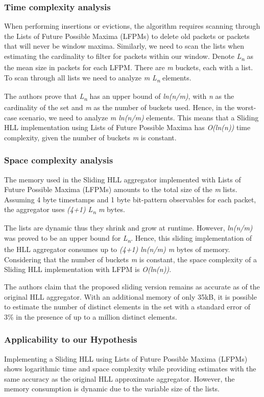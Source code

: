 \subsubsection*{Time complexity analysis}
When performing insertions or evictions, the algorithm requires scanning through the Lists of Future Possible Maxima (LFPMs) to delete old packets or packets that will never be window maxima. Similarly, we need to scan the lists when estimating the cardinality to filter for packets within our window. Denote \textit{L\textsubscript{n}} as the mean size in packets for each LFPM. There are \textit{m} buckets, each with a list. To scan through all lists we need to analyze \textit{m L\textsubscript{n}} elements. 

The authors prove that \textit{L\textsubscript{n}} has an upper bound of \textit{ln(n/m)}, with \textit{n} as the cardinality of the set and \textit{m} as the number of buckets used. Hence, in the worst-case scenario, we need to analyze \textit{m ln(n/m)} elements. This means that a Sliding HLL implementation using Lists of Future Possible Maxima has \textit{O(ln(n))} time complexity, given the number of buckets \textit{m} is constant.

\subsubsection*{Space complexity analysis}
The memory used in the Sliding HLL aggregator implemented with Lists of Future Possible Maxima (LFPMs) amounts to the total size of the \textit{m} lists. Assuming 4 byte timestamps and 1 byte bit-pattern observables for each packet, the aggregator uses \textit{(4+1) L\textsubscript{n} m} bytes. 

The lists are dynamic thus they shrink and grow at runtime. However, \textit{ln(n/m)} was proved to be an upper bound for \textit{L\textsubscript{n}}. Hence, this sliding implementation of the HLL aggregator consumes up to \textit{(4+1) ln(n/m) m} bytes of memory. Considering that the number of buckets \textit{m} is constant, the space complexity of a Sliding HLL implementation with LFPM is \textit{O(ln(n))}.

The authors claim that the proposed sliding version remains as accurate as of the original HLL aggregator. With an additional memory of only 35kB, it is possible to estimate the number of distinct elements in the set with a standard error of 3\% in the presence of up to a million distinct elements.

\subsubsection*{Applicability to our Hypothesis}
Implementing a Sliding HLL using Lists of Future Possible Maxima (LFPMs) shows logarithmic time and space complexity while providing estimates with the same accuracy as the original HLL approximate aggregator. However, the memory consumption is dynamic due to the variable size of the lists. 

